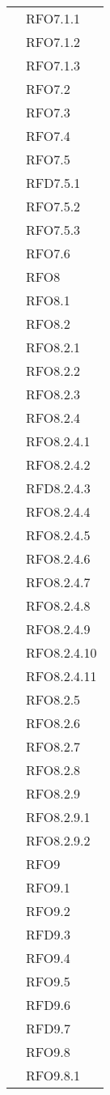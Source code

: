 \begin{longtable}{ p{12cm} | p{4cm} }
			& RFO7.1.1 \\
			& RFO7.1.2 \\
			& RFO7.1.3 \\
			& RFO7.2 \\
			& RFO7.3 \\
			& RFO7.4 \\
			& RFO7.5 \\
			& RFD7.5.1 \\
			& RFO7.5.2 \\
			& RFO7.5.3 \\
			& RFO7.6 \\
			& RFO8 \\
			& RFO8.1 \\
			& RFO8.2 \\
			& RFO8.2.1 \\
			& RFO8.2.2 \\
			& RFO8.2.3 \\
			& RFO8.2.4 \\
			& RFO8.2.4.1 \\
			& RFO8.2.4.2 \\
			& RFD8.2.4.3 \\
			& RFO8.2.4.4 \\
			& RFO8.2.4.5 \\
			& RFO8.2.4.6 \\
			& RFO8.2.4.7 \\
			& RFO8.2.4.8 \\
			& RFO8.2.4.9 \\
			& RFO8.2.4.10 \\
			& RFO8.2.4.11 \\
			& RFO8.2.5 \\
			& RFO8.2.6 \\
			& RFO8.2.7 \\
			& RFO8.2.8 \\
			& RFO8.2.9 \\
			& RFO8.2.9.1 \\
			& RFO8.2.9.2 \\
			& RFO9 \\
			& RFO9.1 \\
			& RFO9.2 \\
			& RFD9.3 \\
			& RFO9.4 \\
			& RFO9.5 \\
			& RFD9.6 \\
			& RFD9.7 \\
			& RFO9.8 \\
			& RFO9.8.1 \\

\end{longtable}
